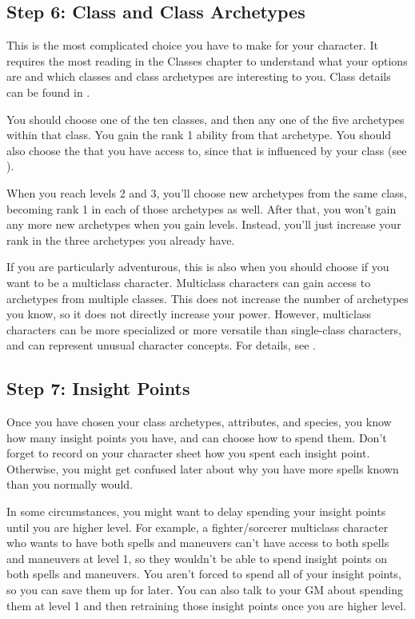     \subsection{Step 6: Class and Class Archetypes}
        This is the most complicated choice you have to make for your character.
        It requires the most reading in the Classes chapter to understand what your options are and which classes and class archetypes are interesting to you.
        Class details can be found in .

        You should choose one of the ten classes, and then any one of the five archetypes within that class.
        You gain the rank 1 ability from that archetype.
        You should also choose the  that you have access to, since that is influenced by your class (see ).

        When you reach levels 2 and 3, you'll choose new archetypes from the same class, becoming rank 1 in each of those archetypes as well.
        After that, you won't gain any more new archetypes when you gain levels.
        Instead, you'll just increase your rank in the three archetypes you already have.

        If you are particularly adventurous, this is also when you should choose if you want to be a multiclass character.
        Multiclass characters can gain access to archetypes from multiple classes.
        This does not increase the number of archetypes you know, so it does not directly increase your power.
        However, multiclass characters can be more specialized or more versatile than single-class characters, and can represent unusual character concepts.
        For details, see .

    \subsection{Step 7: Insight Points}
        Once you have chosen your class archetypes, attributes, and species, you know how many insight points you have, and can choose how to spend them.
        Don't forget to record on your character sheet how you spent each insight point.
        Otherwise, you might get confused later about why you have more spells known than you normally would.

        In some circumstances, you might want to delay spending your insight points until you are higher level.
        For example, a fighter/sorcerer multiclass character who wants to have both spells and maneuvers can't have access to both spells and maneuvers at level 1, so they wouldn't be able to spend insight points on both spells and maneuvers.
        You aren't forced to spend all of your insight points, so you can save them up for later.
        You can also talk to your GM about spending them at level 1 and then retraining those insight points once you are higher level.

